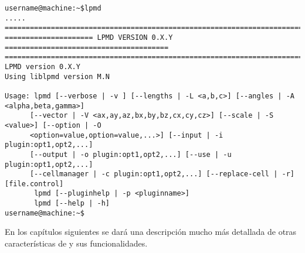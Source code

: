 \begin{verbatim}
username@machine:~$lpmd
.....
================================================================================
===================== LPMD VERSION 0.X.Y =======================================
================================================================================
LPMD version 0.X.Y
Using liblpmd version M.N

Usage: lpmd [--verbose | -v ] [--lengths | -L <a,b,c>] [--angles | -A <alpha,beta,gamma>]
      [--vector | -V <ax,ay,az,bx,by,bz,cx,cy,cz>] [--scale | -S <value>] [--option | -O
      <option=value,option=value,...>] [--input | -i plugin:opt1,opt2,...]  
      [--output | -o plugin:opt1,opt2,...] [--use | -u plugin:opt1,opt2,...] 
      [--cellmanager | -c plugin:opt1,opt2,...] [--replace-cell | -r] [file.control]
       lpmd [--pluginhelp | -p <pluginname>]
       lpmd [--help | -h]
username@machine:~$ 
\end{verbatim}

En los cap\'itulos siguientes se dar\'a una descripci\'on mucho m\'as detallada de otras caracter\'isticas de {\lpmd} y sus funcionalidades.
